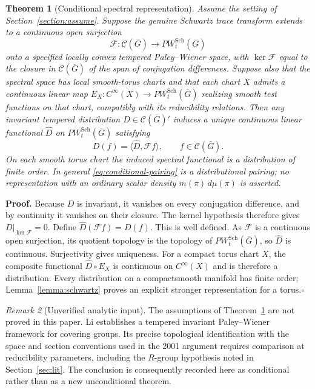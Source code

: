 \documentclass[12pt,letterpaper]{article}
\newtheorem{theorem}{Theorem}[section]
\theoremstyle{definition}
\theoremstyle{remark}
\newtheorem{remark}[theorem]{Remark}
\newcommand{\bG}{\overline{G}}
\newcommand{\calC}{\mathcal C}
\newcommand{\sF}{\mathscr F}
\begin{document}
\begin{theorem}[Conditional spectral representation]\label{thm:main}
Assume the setting of Section~\ref{section:assume}.  Suppose the genuine
Schwartz trace transform extends to a continuous open surjection
\[
\sF:\calC(\bG)\longrightarrow PW_t^{\mathrm{Sch}}(\bG)
\]
onto a specified locally convex tempered Paley--Wiener space, with
$\ker\sF$ equal to the closure in $\calC(\bG)$ of the span of
conjugation differences.  Suppose also that the spectral space has local smooth-torus charts and
that each chart $X$ admits a continuous linear map
$E_X:C^\infty(X)\to PW_t^{\mathrm{Sch}}(\bG)$ realizing smooth
test functions on that chart, compatibly with its reducibility relations.
Then any invariant tempered distribution $D\in\calC(\bG)'$ induces
a unique continuous linear functional $\widehat D$ on
$PW_t^{\mathrm{Sch}}(\bG)$ satisfying
\begin{equation}\label{eq:conditional-pairing}
 D(f)=\langle\widehat D,\sF f\rangle,
 \qquad f\in\calC(\bG).
\end{equation}
On each smooth torus chart the induced spectral functional is a
distribution of finite order.  In general \eqref{eq:conditional-pairing}
is a \emph{distributional pairing}; no representation with an ordinary
scalar density $m(\pi)\,d\mu(\pi)$ is asserted.
\end{theorem}
\noindent\textbf{Proof.}
Because $D$ is invariant, it vanishes on every conjugation difference,
and by continuity it vanishes on their closure.  The kernel hypothesis
therefore gives $D|_{\ker\sF}=0$.  Define
$\widehat D(\sF f)=D(f)$.  This is well defined.  As $\sF$ is a
continuous open surjection, its quotient topology is the topology of
$PW_t^{\mathrm{Sch}}(\bG)$, so $\widehat D$ is continuous.  Surjectivity
gives uniqueness.  For a compact torus chart $X$, the composite functional
$\widehat D\circ E_X$ is continuous on $C^\infty(X)$ and is therefore
a distribution.  Every distribution on a compactsmooth manifold has finite order; Lemma~\ref{lemma:schwartz} proves
an explicit stronger representation for a torus.\hfill$\square$

\begin{remark}[Unverified analytic input]\label{rem:tpw-input}
The assumptions of Theorem~\ref{thm:main} are not proved in this paper.
Li \cite[Section~5.6]{Li12} establishes a tempered invariant
Paley--Wiener framework for covering groups.  Its precise topological
identification with the space and section conventions used in the
2001 argument requires comparison at reducibility parameters, including
the $R$-group hypothesis noted in Section~\ref{sec:lit}.
The conclusion is consequently recorded here as conditional rather
than as a new unconditional theorem.
\end{remark}
\end{document}
